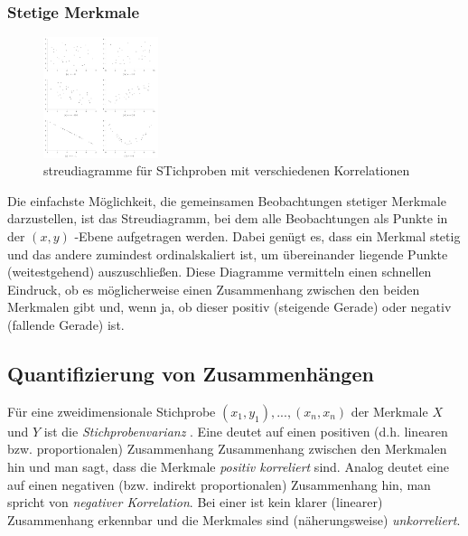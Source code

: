 \subsubsection{Stetige Merkmale}
\begin{figure}
    \vspace{-8mm}
    \centering
    \includegraphics[width=0.3\textwidth]{images/3.4_streudiagramme_mit_unterschiedlicher_kor.png}
    \caption{streudiagramme für STichproben mit verschiedenen Korrelationen}
    \vspace{-12mm}
    \label{fig:streudiagramme}
\end{figure}
Die einfachste Möglichkeit, die gemeinsamen Beobachtungen stetiger Merkmale darzustellen, ist das Streudiagramm, bei dem alle Beobachtungen als Punkte in der $(x, y)$ -Ebene aufgetragen werden. Dabei genügt es, dass ein Merkmal stetig und das andere zumindest ordinalskaliert ist, um übereinander liegende Punkte (weitestgehend) auszuschließen. Diese Diagramme vermitteln einen schnellen Eindruck, ob es möglicherweise einen Zusammenhang zwischen den beiden Merkmalen gibt und, wenn ja, ob dieser positiv (steigende Gerade) oder negativ (fallende Gerade) ist.

\subsection{Quantifizierung von Zusammenhängen}
Für eine zweidimensionale Stichprobe $(x_1, y_1), ..., (x_n, x_n)$ der Merkmale $X$ und $Y$ ist die \emph{Stichprobenvarianz} . Eine  deutet auf einen positiven (d.h. linearen bzw. proportionalen) Zusammenhang Zusammenhang zwischen den Merkmalen hin und man sagt, dass die Merkmale \emph{positiv korreliert} sind. Analog deutet eine  auf einen negativen (bzw. indirekt proportionalen) Zusammenhang hin, man spricht von \emph{negativer Korrelation}. Bei einer  ist kein klarer (linearer) Zusammenhang erkennbar und die Merkmales sind (näherungsweise) \emph{unkorreliert}.\\\\

